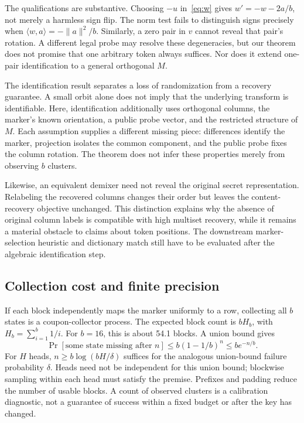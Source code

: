 The qualifications are substantive. Choosing $-u$ in~\eqref{eq:w} gives $w'=-w-2a/b$, not merely a harmless sign flip. The norm test fails to distinguish signs precisely when $\langle w,a\rangle=-\|a\|^2/b$. Similarly, a zero pair in $v$ cannot reveal that pair's rotation. A different legal probe may resolve these degeneracies, but our theorem does not promise that one arbitrary token always suffices. Nor does it extend one-pair identification to a general orthogonal $M$.

The identification result separates a loss of randomization from a recovery guarantee. A small orbit alone does not imply that the underlying transform is identifiable. Here, identification additionally uses orthogonal columns, the marker's known orientation, a public probe vector, and the restricted structure of $M$. Each assumption supplies a different missing piece: differences identify the marker, projection isolates the common component, and the public probe fixes the column rotation. The theorem does not infer these properties merely from observing $b$ clusters.

Likewise, an equivalent demixer need not reveal the original secret representation. Relabeling the recovered columns changes their order but leaves the content-recovery objective unchanged. This distinction explains why the absence of original column labels is compatible with high multiset recovery, while it remains a material obstacle to claims about token positions. The downstream marker-selection heuristic and dictionary match still have to be evaluated after the algebraic identification step.

\subsection{Collection cost and finite precision}
If each block independently maps the marker uniformly to a row, collecting all $b$ states is a coupon-collector process. The expected block count is $bH_b$, with $H_b=\sum_{i=1}^b1/i$. For $b=16$, this is about 54.1 blocks. A union bound gives
\begin{equation}
 \Pr[\text{some state missing after }n]\le b(1-1/b)^n
 \le be^{-n/b}.
 \label{eq:collection}
\end{equation}
For $H$ heads, $n\ge b\log(bH/\delta)$ suffices for the analogous union-bound failure probability $\delta$. Heads need not be independent for this union bound; blockwise sampling within each head must satisfy the premise. Prefixes and padding reduce the number of usable blocks. A count of observed clusters is a calibration diagnostic, not a guarantee of success within a fixed budget or after the key has changed.

